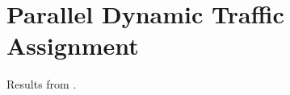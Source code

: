 \chapter{Parallel Dynamic Traffic Assignment} \label{a:parallel}
Results  from \citep{attanasi2015real}.